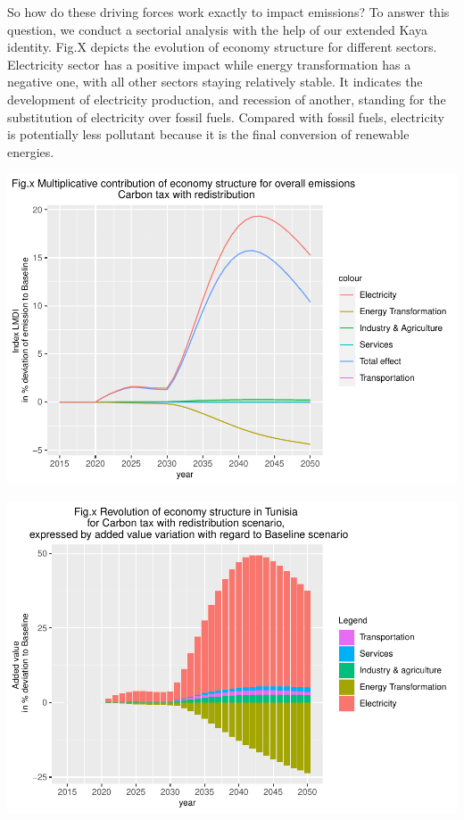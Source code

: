 \documentclass[
]{article}
\begin{document}
So how do these driving forces work exactly to impact emissions? To
answer this question, we conduct a sectorial analysis with the help of
our extended Kaya identity. Fig.X depicts the evolution of economy
structure for different sectors. Electricity sector has a positive
impact while energy transformation has a negative one, with all other
sectors staying relatively stable. It indicates the development of
electricity production, and recession of another, standing for the
substitution of electricity over fossil fuels. Compared with fossil
fuels, electricity is potentially less pollutant because it is the final
conversion of renewable energies.

\begin{center}\includegraphics[width=0.7\linewidth,height=0.7\textheight]{Modele-ThreeMe-Tunisie_Sequeira_Valilou_Wang_files/figure-latex/unnamed-chunk-22-1} \end{center}

\begin{center}\includegraphics[width=0.7\linewidth,height=0.7\textheight]{Modele-ThreeMe-Tunisie_Sequeira_Valilou_Wang_files/figure-latex/unnamed-chunk-23-1} \end{center}
\end{document}
